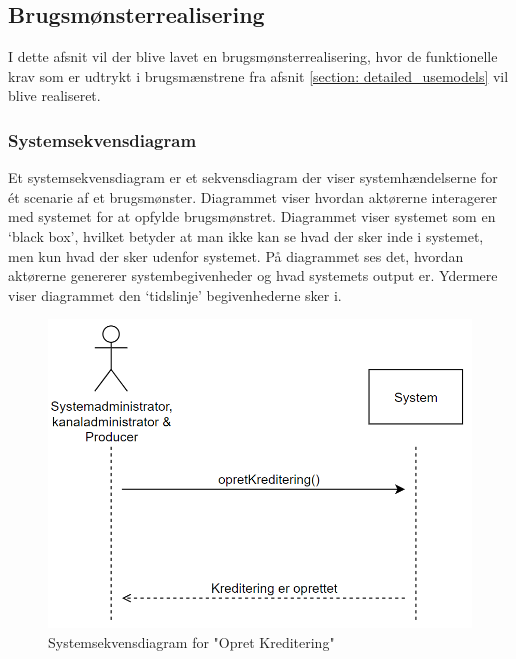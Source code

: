 \subsection{Brugsmønsterrealisering}
I dette afsnit vil der blive lavet en brugsmønsterrealisering, hvor de funktionelle krav som er udtrykt i brugsmænstrene fra afsnit \ref{section: detailed_usemodels} vil blive realiseret.

\subsubsection{Systemsekvensdiagram}
Et systemsekvensdiagram er et sekvensdiagram der viser systemhændelserne for ét scenarie af et brugsmønster. Diagrammet viser hvordan aktørerne interagerer med systemet for at opfylde brugsmønstret. Diagrammet viser systemet som en ‘black box’, hvilket betyder at man ikke kan se hvad der sker inde i systemet, men kun hvad der sker udenfor systemet. På diagrammet ses det, hvordan aktørerne genererer systembegivenheder og hvad systemets output er. Ydermere viser diagrammet den ‘tidslinje’ begivenhederne sker i. \\

\begin{figure}[ht]
    \centering
    \includegraphics[scale=0.5]{figures/systemsekvensdiagrammer/opretKreditering.PNG}
    \caption{Systemsekvensdiagram for "Opret Kreditering"}
    \label{fig:systemsekvensdiagram_opretKreditering}
\end{figure}


